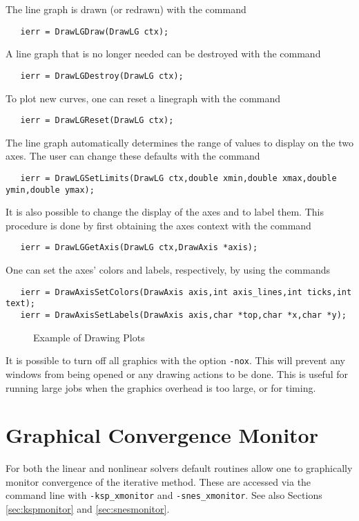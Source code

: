 The line graph is drawn (or redrawn) with the command 
\begin{verbatim}
   ierr = DrawLGDraw(DrawLG ctx);
\end{verbatim}
A line graph that is no longer needed can be destroyed with the 
command 
\begin{verbatim}
   ierr = DrawLGDestroy(DrawLG ctx);
\end{verbatim}
To plot new curves, one can reset a linegraph with the
command 
\begin{verbatim}
   ierr = DrawLGReset(DrawLG ctx);
\end{verbatim}
The line graph automatically determines the range of values to 
display on the two axes.  The user can change these defaults with the 
command 
\begin{verbatim}
   ierr = DrawLGSetLimits(DrawLG ctx,double xmin,double xmax,double ymin,double ymax);
\end{verbatim}

It is also possible to change the display of the axes and to label
them. This procedure is done by first obtaining the axes context with the 
command  
\begin{verbatim}
   ierr = DrawLGGetAxis(DrawLG ctx,DrawAxis *axis);
\end{verbatim}
One can set the axes' colors and labels, respectively, by using the
commands  
\begin{verbatim}
   ierr = DrawAxisSetColors(DrawAxis axis,int axis_lines,int ticks,int text);
   ierr = DrawAxisSetLabels(DrawAxis axis,char *top,char *x,char *y);
\end{verbatim}

\begin{figure}[H]
{\small
{}
}
\caption{Example of Drawing Plots}
\label{fig:plot}
\end{figure}

It is possible to turn off all graphics with the option 
{\tt -nox}. This
will prevent any windows from being opened or any drawing actions to be done.
This is useful for running large jobs when the graphics overhead is too
large, or for timing.

\section{Graphical Convergence Monitor}
For both the linear and nonlinear solvers default routines
allow one to graphically monitor convergence of the iterative method.
These are accessed via the command line with 
{\tt -ksp\_xmonitor} and {\tt -snes\_xmonitor}. 
 See also Sections \ref{sec:kspmonitor} and
\ref{sec:snesmonitor}. 

